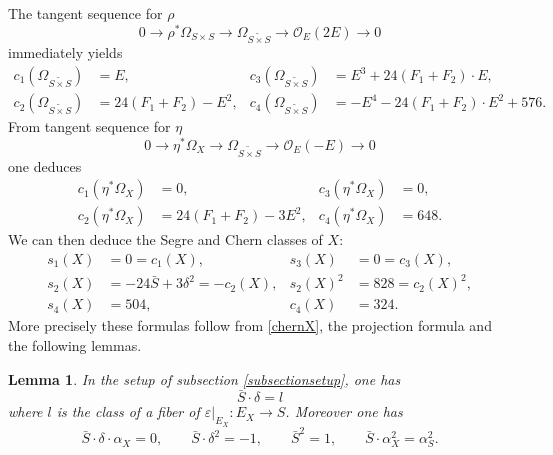 \documentclass[JEP,XML,SOM,Unicode,NoEqCountersInSection,published]{cedram}
\let\mathcal\mathscr
\theoremstyle{plain}
\newtheorem{lemma}[theorem]{Lemma}
\theoremstyle{definition}
\newcommand\sO{{\mathcal O}}
\newcommand{\blS}{\ensuremath{\widetilde{S \times S}}}
\begin{document}
The tangent sequence for $\rho$
\[
0 \to \rho^* \Omega_{S \times S} \to \Omega_{\blS} \to \sO_E(2E) \to 0
\]
immediately yields
\begin{equation} \label{chernblowup}
\begin{aligned}
c_1(\Omega_{\blS}) &= E, &
c_3(\Omega_{\blS}) &= E^3+ 24 (F_1+F_2) \cdot E,
\\
c_2(\Omega_{\blS}) &= 24 (F_1+F_2) - E^2, &
c_4(\Omega_{\blS}) &= - E^4 - 24 (F_1+F_2) \cdot E^2 + 576.
\end{aligned}
\end{equation}
From tangent sequence for $\eta$
\[
0 \to \eta^* \Omega_X \to \Omega_{\blS} \to \sO_E(-E) \to 0
\]
one deduces
\begin{equation} \label{chernX}
\begin{aligned}
c_1(\eta^* \Omega_X) &= 0, &
c_3(\eta^* \Omega_X) &= 0,
\\
c_2(\eta^* \Omega_X) &= 24 (F_1+F_2) - 3 E^2, &
c_4(\eta^* \Omega_X) &= 648.
\end{aligned}
\end{equation}
We can then deduce the Segre and Chern classes of $X$:
\begin{equation} \label{segreX}
\begin{aligned}
s_1(X) &= 0 = c_1(X),
&
s_3(X)&=0 = c_3(X),
\\
s_2(X) &= -24 \bar S + 3 \delta^2 = -c_2(X),
&
s_2(X)^2&=828=c_2(X)^2,
\\
s_4(X) &= 504,
&
c_4(X) &= 324.
\end{aligned}
\end{equation}
More precisely these formulas follow from \eqref{chernX}, the projection formula and the following lemmas.

\begin{lemma} \label{intersectionsS}
In the setup of subsection \ref{subsectionsetup}, one has
\[
\bar S \cdot \delta = l
\]
where $l$ is the class of a fiber of $\varepsilon|_{E_X}: E_X \to S$. Moreover one has
\[
\bar S \cdot \delta \cdot \alpha_X = 0, \qquad \bar S \cdot \delta^2=-1, \qquad \bar S^2 = 1, \qquad \bar S \cdot \alpha_X^2=\alpha_S^2.
\]
\end{lemma}
\end{document}

